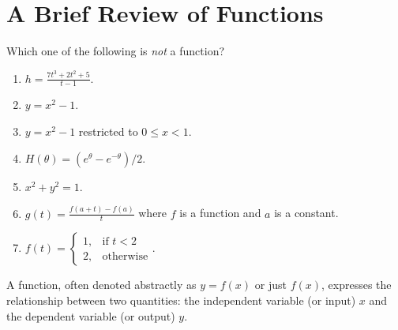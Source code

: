 \documentclass[../main.tex]{subfiles}
\begin{document}

%
%
%
%
\section{A Brief Review of Functions}

\begin{example}
  Which one of the following is \emph{not} a function?
  \begin{enumerate}[label=(\alph*)]
    \item \(h = \frac{7t^{3} + 2t^{2} + 5}{t - 1}\).
    \item \(y = x^{2} - 1\).
    \item \(y = x^{2} - 1\) restricted to \(0 \le x < 1\).
    \item \(H(\theta) = (e^{\theta} - e^{-\theta})/2\).
    \item \(x^{2} + y^{2} = 1\).
    \item \(g(t) = \frac{f(a + t) - f(a)}{t}\) where \(f\) is a function and \(a\) is a constant.
    \item \(f(t) = \begin{cases} 1, &\text{if } t < 2 \\ 2, &\text{otherwise} \end{cases}\).
  \end{enumerate}
\end{example}

A function, often denoted abstractly as \(y = f(x)\) or just \(f(x)\), expresses the relationship between two quantities: the {independent variable} (or input) \(x\) and the {dependent variable} (or output) \(y\).
\end{document}
